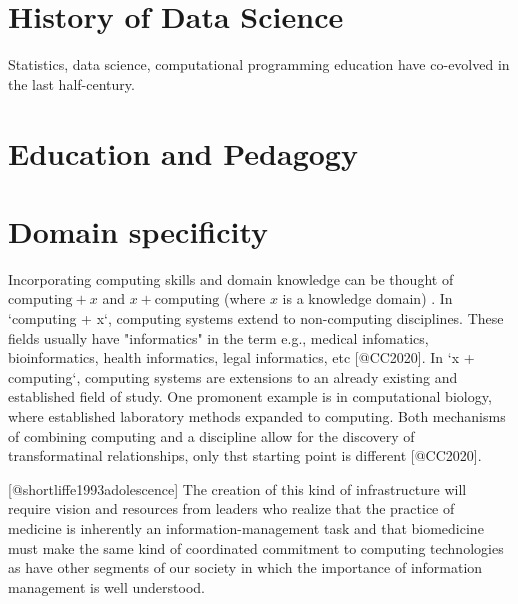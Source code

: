 \documentclass[../main.tex]{subfiles}
\begin{document}
    

    \section{History of Data Science}
        \label{se:intro-ds-history}

        Statistics, data science, computational programming education
        have co-evolved in the last half-century.

        
        
        
        
        

    \section{Education and Pedagogy}

        
        
        

    \section{Domain specificity}

        Incorporating computing skills and domain knowledge can be thought of
        $\text{computing} + x$ and $x + \text{computing}$ (where $x$ is a knowledge domain)
        \cite{cc2020}.
        In `computing + x`, computing systems extend to non-computing disciplines.
        These fields usually have "informatics" in the term
        e.g., medical infomatics, bioinformatics, health informatics, legal informatics, etc [@CC2020].
        In `x + computing`,
        computing systems are extensions to an already existing and established field of study.
        One promonent example is in computational biology,
        where established laboratory methods expanded to computing.
        Both mechanisms of combining computing and a discipline allow for the discovery of transformatinal relationships,
        only thst starting point is different [@CC2020].


        [@shortliffe1993adolescence]
        The creation of this kind of infrastructure will require vision and resources from leaders who realize that the practice of medicine is inherently an information-management task and that biomedicine must make the same kind of coordinated commitment to computing technologies as have other segments of our society in which the importance of information management is well understood.
\end{document}
